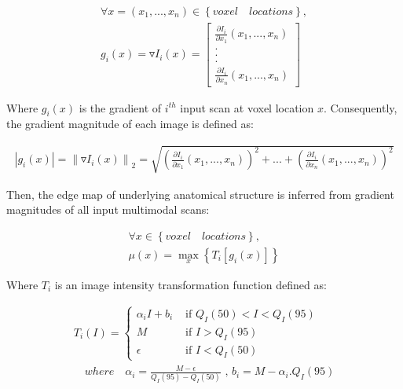 \begin{equation}
\label{eq:gradient}
\begin{gathered}
\forall x=(x_{1}, ..., x_{n})\in \left\{voxel \quad locations\right\}, \\
g_{i}(x) = \triangledown I_{i}(x) = \begin{bmatrix}
\frac{\partial I_{i}}{\partial x_{1}}(x_{1}, ..., x_{n}) \\
.\\
.\\
.\\
\frac{\partial I_{i}}{\partial x_{n}}(x_{1}, ..., x_{n})
\end{bmatrix}
\end{gathered}
\end{equation}

Where $g_{i}(x)$ is the gradient of $i^{th}$ input scan at voxel location $x$.
Consequently, the gradient magnitude of each image is defined as:

\begin{equation}
\label{eq:gradientMagnitude}
\begin{gathered}
\left | g_{i}(x) \right | = \left \| \triangledown I_{i}(x) \right \|_{2} = \sqrt{ (\frac{\partial I_{i}}{\partial x_{1}}(x_{1}, ..., x_{n}))^{2} + ... + (\frac{\partial I_{i}}{\partial x_{n}}(x_{1}, ..., x_{n}))^{2} }
\end{gathered}
\end{equation}

Then, the edge map of underlying anatomical structure is inferred from gradient magnitudes of all input multimodal scans:

\begin{equation}
\label{eq:edgemap}
\begin{gathered}
\forall x\in \left\{voxel \quad locations\right\}, \\
\mu (x) =
\max_{x}
\left \{ T_{i}\left [ g_{i}(x) \right ] \right \}
\end{gathered}
\end{equation}

Where $T_{i}$ is an image intensity transformation function defined as:

\begin{equation}
\label{eq:intensityTransformFunc}
\begin{gathered}
T_{i}(I) = \begin{cases}
\alpha_{i} I + b_{i} & \text{ if   } Q_I(50) < I < Q_I(95) \\
M & \text{ if } I > Q_I(95) \\
\epsilon  & \text{ if } I < Q_I(50)
\end{cases} \\
\quad where \quad \alpha_{i} = \frac{M-\epsilon }{Q_{I}(95)-Q_{I}(50)}
\text{  ,  } b_{i} = M - \alpha_{i} . Q_{I}(95)
\end{gathered}
\end{equation}

